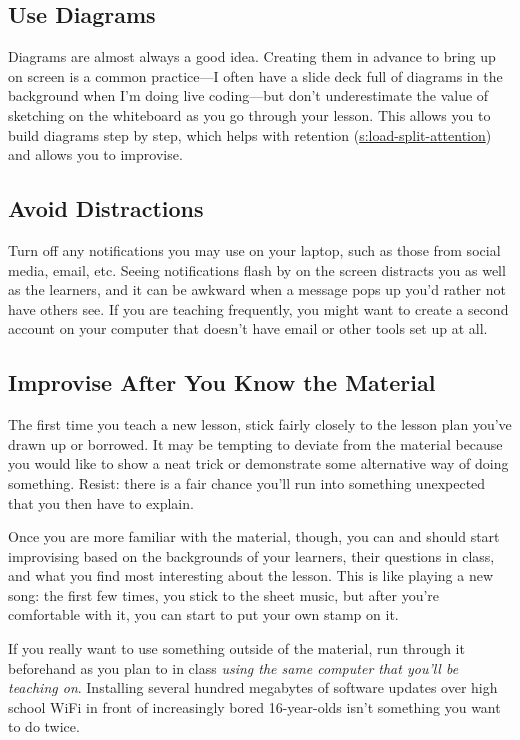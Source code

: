 \subsection{Use Diagrams}\label{use-diagrams}

Diagrams are almost always a good idea. Creating them in advance to
bring up on screen is a common practice---I often have a slide deck full
of diagrams in the background when I'm doing live coding---but don't
underestimate the value of sketching on the whiteboard as you go through
your lesson. This allows you to build diagrams step by step, which helps
with retention (\protect\hyperlink{SECTION}{s:load-split-attention}) and allows you to
improvise.

\subsection{Avoid Distractions}\label{avoid-distractions}

Turn off any notifications you may use on your laptop, such as those
from social media, email, etc. Seeing notifications flash by on the
screen distracts you as well as the learners, and it can be awkward when
a message pops up you'd rather not have others see. If you are teaching
frequently, you might want to create a second account on your computer
that doesn't have email or other tools set up at all.

\subsection{Improvise After You Know the Material}\label{improvise-after-you-know-the-material}

The first time you teach a new lesson, stick fairly closely to the
lesson plan you've drawn up or borrowed. It may be tempting to deviate
from the material because you would like to show a neat trick or
demonstrate some alternative way of doing something. Resist: there is a
fair chance you'll run into something unexpected that you then have to
explain.

Once you are more familiar with the material, though, you can and should
start improvising based on the backgrounds of your learners, their
questions in class, and what you find most interesting about the lesson.
This is like playing a new song: the first few times, you stick to the
sheet music, but after you're comfortable with it, you can start to put
your own stamp on it.

If you really want to use something outside of the material, run through
it beforehand as you plan to in class \emph{using the same computer that
you'll be teaching on}. Installing several hundred megabytes of
software updates over high school WiFi in front of increasingly bored
16-year-olds isn't something you want to do twice.

